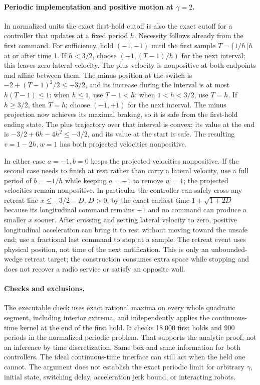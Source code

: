 \documentclass[11pt]{article}
\begin{document}
\paragraph{Periodic implementation and positive motion at \(\gamma=2\).}
In normalized units the exact first-hold cutoff is also the exact cutoff for a controller that updates at a fixed period \(h\). Necessity follows already from the first command. For sufficiency, hold \((-1,-1)\) until the first sample \(T=\lceil1/h\rceil h\) at or after time 1. If \(h<3/2\), choose \((-1,(T-1)/h)\) for the next interval; this leaves zero lateral velocity. The plus velocity is nonpositive at both endpoints and affine between them. The minus position at the switch is \(-2+(T-1)^2/2\leq-3/2\), and its increase during the interval is at most \(h(T-1)\leq1\): when \(h\leq1\), use \(T-1<h\); when \(1<h<3/2\), use \(T=h\). If \(h\geq3/2\), then \(T=h\); choose \((-1,+1)\) for the next interval. The minus projection now achieves its maximal braking, so it is safe from the first-hold ending state. The plus trajectory over that interval is convex; its value at the end is \(-3/2+6h-4h^2\leq-3/2\), and its value at the start is safe. The resulting \(v=1-2h,w=1\) has both projected velocities nonpositive.
\par
In either case \(a=-1,b=0\) keeps the projected velocities nonpositive. If the second case needs to finish at rest rather than carry a lateral velocity, use a full period of \(b=-1/h\) while keeping \(a=-1\) to remove \(w=1\); the projected velocities remain nonpositive. In particular the controller can safely cross any retreat line \(x\leq-3/2-D\), \(D>0\), by the exact earliest time \(1+\sqrt{1+2D}\) because its longitudinal command remains \(-1\) and no command can produce a smaller \(x\) sooner. After crossing and setting lateral velocity to zero, positive longitudinal acceleration can bring it to rest without moving toward the unsafe end; use a fractional last command to stop at a sample. The retreat event uses physical position, not time of the next notification. This is only an unbounded-wedge retreat target; the construction consumes extra space while stopping and does not recover a radio service or satisfy an opposite wall.
\paragraph{Checks and exclusions.}
The executable check uses exact rational maxima on every whole quadratic segment, including interior extrema, and independently applies the continuous-time kernel at the end of the first hold. It checks 18,000 first holds and 900 periods in the normalized periodic problem. That supports the analytic proof, not an inference by time discretization. Same box and same information for both controllers. The ideal continuous-time interface can still act when the held one cannot. The argument does not establish the exact periodic limit for arbitrary $\gamma$, initial state, switching delay, acceleration jerk bound, or interacting robots.
\end{document}
